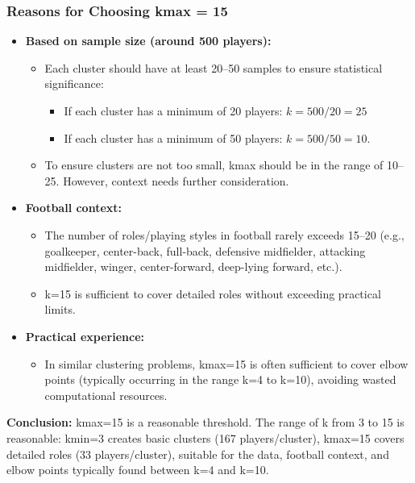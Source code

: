 \documentclass[12pt, a4paper]{report}
\begin{document}
\subsubsection*{Reasons for Choosing kmax = 15}
\begin{itemize}
    \item \textbf{Based on sample size (around 500 players):}
    \begin{itemize}
        \item Each cluster should have at least 20–50 samples to ensure statistical significance:
        \begin{itemize}
            \item If each cluster has a minimum of 20 players: $k = 500/20 = 25$
            \item If each cluster has a minimum of 50 players: $k = 500/50 = 10$.
        \end{itemize}
        \item To ensure clusters are not too small, kmax should be in the range of 10–25. However, context needs further consideration.
    \end{itemize}
    \item \textbf{Football context:}
    \begin{itemize}
        \item The number of roles/playing styles in football rarely exceeds 15–20 (e.g., goalkeeper, center-back, full-back, defensive midfielder, attacking midfielder, winger, center-forward, deep-lying forward, etc.).
        \item k=15 is sufficient to cover detailed roles without exceeding practical limits.
    \end{itemize}
    \item \textbf{Practical experience:}
    \begin{itemize}
        \item In similar clustering problems, kmax=15 is often sufficient to cover elbow points (typically occurring in the range k=4 to k=10), avoiding wasted computational resources.
    \end{itemize}
\end{itemize}
\textbf{Conclusion:} kmax=15 is a reasonable threshold.
The range of k from 3 to 15 is reasonable: kmin=3 creates basic clusters (167 players/cluster), kmax=15 covers detailed roles (33 players/cluster), suitable for the data, football context, and elbow points typically found between k=4 and k=10.
\end{document}

